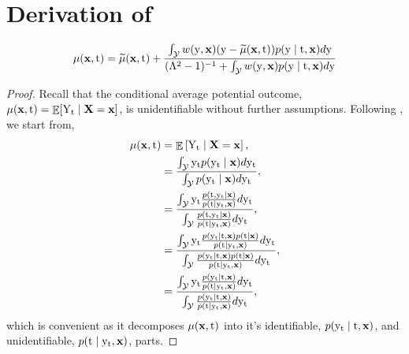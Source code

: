 \section{Derivation of }
\begin{lemma}
    \label{lem:capo}
    \begin{align}
        \mu(\x, \tf) = \mut(\x, \tf) + \frac{\int_\Ycal w(\y, \x) (\y - \mut(\x, \tf)) p(\y \mid \tf, \x)d\y}{(\Lambda^2 - 1)^{-1} + \int_\Ycal w(\y, \x)p(\y \mid \tf, \x)d\y}
    \end{align}
    \begin{proof}
        Recall that the conditional average potential outcome, $\mu(\x, \tf) = \E[\Yt \mid \X=\x]$, is unidentifiable without further assumptions. Following \cite{kallus2019interval}, we start from,
        \begin{subequations}
            \begin{align*}
                \mu(\x, \tf) 
                &= \E\left[\Yt \mid \X=\x\right], \\
                &= \frac{\int_{\Ycal}\yt p(\yt \mid \x)d\yt}{\int_{\Ycal}p(\yt \mid \x)d\yt}, \\
                &= \frac{\int_{\Ycal} \yt \frac{p(\tf, \yt \mid \x)}{p(\tf \mid \yt, \x)}d\yt}{\int_{\Ycal} \frac{p(\tf, \yt \mid \x)}{p(\tf \mid \yt, \x)}d\yt}, \\
                &= \frac{\int_{\Ycal} \yt \frac{p(\yt \mid \tf, \x)p(\tf \mid \x)}{p(\tf \mid \yt, \x)}d\yt}{\int_{\Ycal} \frac{p(\yt \mid \tf, \x)p(\tf \mid \x)}{p(\tf \mid \yt, \x)}d\yt}, \\
                &= \frac{\int_{\Ycal} \yt \frac{p(\yt \mid \tf, \x)}{p(\tf \mid \yt, \x)}d\yt}{\int_{\Ycal} \frac{p(\yt \mid \tf, \x)}{p(\tf \mid \yt, \x)}d\yt},
            \end{align*}
        \end{subequations}
        which is convenient as it decomposes $\mu(\x, \tf)$ into it's identifiable, $p(\yt \mid \tf, \x)$, and unidentifiable, $p(\tf \mid \yt, \x)$, parts.
        

\end{proof}
\end{lemma}
